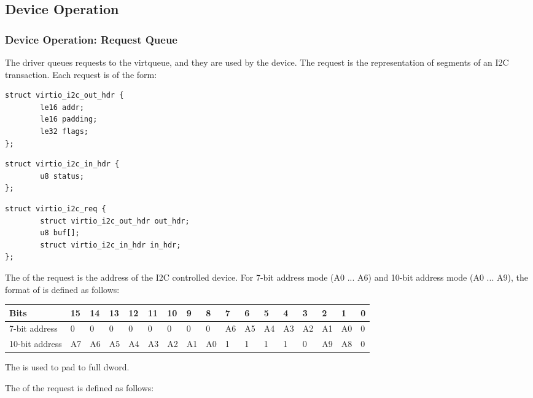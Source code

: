 \subsection{Device Operation}\label{sec:Device Types / I2C Adapter Device / Device Operation}

\subsubsection{Device Operation: Request Queue}\label{sec:Device Types / I2C Adapter Device / Device Operation: Request Queue}

The driver queues requests to the virtqueue, and they are used by the
device. The request is the representation of segments of an I2C
transaction. Each request is of the form:

\begin{lstlisting}
struct virtio_i2c_out_hdr {
        le16 addr;
        le16 padding;
        le32 flags;
};
\end{lstlisting}

\begin{lstlisting}
struct virtio_i2c_in_hdr {
        u8 status;
};
\end{lstlisting}

\begin{lstlisting}
struct virtio_i2c_req {
        struct virtio_i2c_out_hdr out_hdr;
        u8 buf[];
        struct virtio_i2c_in_hdr in_hdr;
};
\end{lstlisting}

The  of the request is the address of the I2C controlled device.
For 7-bit address mode (A0 ... A6) and 10-bit address mode (A0 ... A9),
the format of  is defined as follows:

\begin{tabular}{ |l||l|l|l|l|l|l|l|l|l|l|l|l|l|l|l|l| }
\hline
Bits           & 15 & 14 & 13 & 12 & 11 & 10 & 9  & 8  & 7  & 6  & 5  & 4  & 3  & 2  & 1  & 0 \\
\hline
7-bit address  & 0  & 0  & 0  & 0  & 0  & 0  & 0  & 0  & A6 & A5 & A4 & A3 & A2 & A1 & A0 & 0 \\
\hline
10-bit address & A7 & A6 & A5 & A4 & A3 & A2 & A1 & A0 & 1  & 1  & 1  & 1  & 0  & A9 & A8 & 0 \\
\hline
\end{tabular}

The  is used to pad to full dword.

The  of the request is defined as follows:

